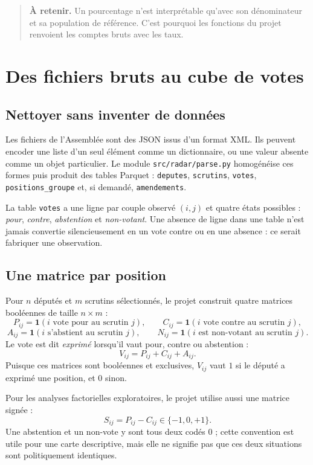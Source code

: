 \documentclass[11pt,a4paper]{article}
\newcommand{\ind}{\mathbf{1}}
\newcommand{\code}[1]{\texttt{#1}}
\newcommand{\important}[1]{\begin{quote}\small\color{blue!55!black}\textbf{À retenir.} #1\end{quote}}
\begin{document}
\important{Un pourcentage n'est interprétable qu'avec son dénominateur et sa
population de référence. C'est pourquoi les fonctions du projet renvoient les
comptes bruts avec les taux.}

\section{Des fichiers bruts au cube de votes}

\subsection{Nettoyer sans inventer de données}

Les fichiers de l'Assemblée sont des JSON issus d'un format XML. Ils peuvent
encoder une liste d'un seul élément comme un dictionnaire, ou une valeur absente
comme un objet particulier. Le module \code{src/radar/parse.py} homogénéise ces
formes puis produit des tables Parquet : \code{deputes}, \code{scrutins},
\code{votes}, \code{positions\_groupe} et, si demandé, \code{amendements}.

La table \code{votes} a une ligne par couple observé $(i,j)$ et quatre états
possibles : \emph{pour}, \emph{contre}, \emph{abstention} et \emph{non-votant}.
Une absence de ligne dans une table n'est jamais convertie silencieusement en
un vote contre ou en une absence : ce serait fabriquer une observation.

\subsection{Une matrice par position}

Pour $n$ députés et $m$ scrutins sélectionnés, le projet construit quatre
matrices booléennes de taille $n\times m$ :
\[
 P_{ij}=\ind(\text{$i$ vote pour au scrutin $j$}),\qquad
 C_{ij}=\ind(\text{$i$ vote contre au scrutin $j$}),
\]
\[
 A_{ij}=\ind(\text{$i$ s'abstient au scrutin $j$}),\qquad
 N_{ij}=\ind(\text{$i$ est non-votant au scrutin $j$}).
\]
Le vote est dit \emph{exprimé} lorsqu'il vaut pour, contre ou abstention :
\[
 V_{ij}=P_{ij}+C_{ij}+A_{ij}.
\]
Puisque ces matrices sont booléennes et exclusives, $V_{ij}$ vaut $1$ si le
député a exprimé une position, et $0$ sinon.

Pour les analyses factorielles exploratoires, le projet utilise aussi une
matrice signée :
\[
 S_{ij}=P_{ij}-C_{ij}\in\{-1,0,+1\}.
\]
Une abstention et un non-vote y sont tous deux codés $0$ ; cette convention est
utile pour une carte descriptive, mais elle ne signifie pas que ces deux
situations sont politiquement identiques.
\end{document}
